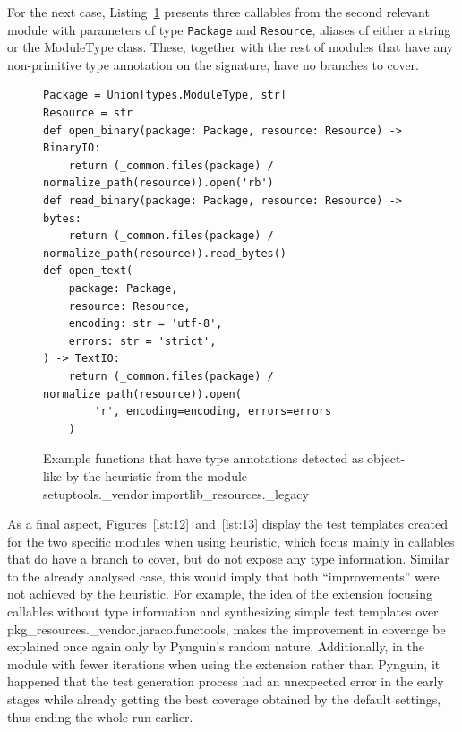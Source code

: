 \documentclass[%
  chapterprefix=false,%
  open=right,%
  twoside=true,%
  paper=a4,%
  logofile={Figures/logo.png},%
  thesistype=master,%
  UKenglish,%
]{se2thesis}
\newcommand{\classname}[1]{\texttt{#1}}
\begin{document}
For the next case, Listing~\ref{lst:11} presents three callables from the second relevant module with parameters of type \classname{Package} and \classname{Resource}, aliases of either a string or the ModuleType class.
These, together with the rest of modules that have any non-primitive type annotation on the signature, have no branches to cover.

\begin{figure}[thbp]
\begin{verbatim}
Package = Union[types.ModuleType, str]
Resource = str
def open_binary(package: Package, resource: Resource) -> BinaryIO:
    return (_common.files(package) / normalize_path(resource)).open('rb')
def read_binary(package: Package, resource: Resource) -> bytes:
    return (_common.files(package) / normalize_path(resource)).read_bytes()
def open_text(
    package: Package,
    resource: Resource,
    encoding: str = 'utf-8',
    errors: str = 'strict',
) -> TextIO:
    return (_common.files(package) / normalize_path(resource)).open(
        'r', encoding=encoding, errors=errors
    )
\end{verbatim}
\caption{Example functions that have type annotations detected as object-like by the heuristic from the module setuptools.\_vendor.importlib\_resources.\_legacy}\label{lst:11}
\end{figure}

As a final aspect, Figures~\ref{lst:12}~and~\ref{lst:13} display the test templates created for the two specific modules when using heuristic, which focus mainly in callables that do have a branch to cover, but do not expose any type information.
Similar to the already analysed case, this would imply that both ``improvements'' were not achieved by the heuristic.
For example, the idea of the extension focusing callables without type information and synthesizing simple test templates over pkg\_resources.\_vendor.jaraco.functools, makes the improvement in coverage be explained once again only by Pynguin's random nature.
Additionally, in the module with fewer iterations when using the extension rather than Pynguin, it happened that the test generation process had an unexpected error in the early stages while already getting the best coverage obtained by the default settings, thus ending the whole run earlier. 
\end{document}
